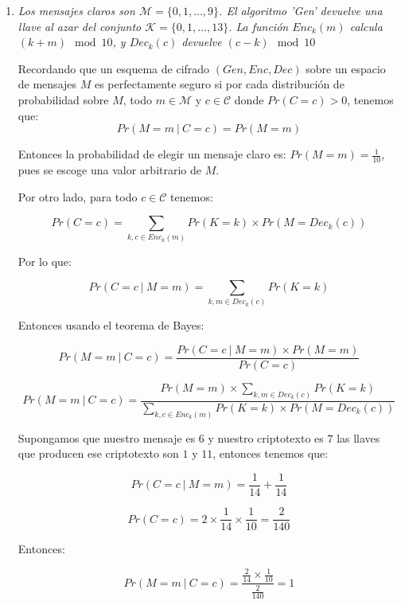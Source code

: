 \documentclass[11pt]{article}
\begin{document}
        \begin{enumerate}[label=\alph*)]
            \item \textit{Los mensajes claros son $ \mathcal{M} = \{0, 1, \dots, 9\} $. El algoritmo 'Gen' devuelve una llave al azar del conjunto $ \mathcal{K} = \{0, 1, \dots, 13\} $. La función $ Enc_{k}(m) $ calcula $ (k + m) \mod{10} $, y $ Dec_{k}(c) $ devuelve $ (c - k) \mod{10} $}
            
            Recordando que un esquema de cifrado $ (Gen, Enc, Dec) $ sobre un espacio de mensajes $ M $ es perfectamente seguro si por cada distribución de probabilidad sobre $ M $, todo $ m \in \mathcal{M} $ y $ c \in \mathcal{C} $ donde $ Pr(C = c) > 0 $, tenemos que:
            $$ Pr(M = m\ |\ C = c) = Pr(M = m) $$
            
            Entonces la probabilidad de elegir un mensaje claro es: $ Pr(M=m) = \frac{1}{10} $, pues se escoge una valor arbitrario de $ M $. 
            
            Por otro lado, para todo $ c \in \mathcal{C} $ tenemos:
            
            $$ \displaystyle Pr(C = c) = \sum_{k, c \in Enc_k(m)} Pr(K = k) \times Pr(M = Dec_{k}(c)) $$
            
            Por lo que:
            
            $$ Pr(C = c\ |\ M = m) = \sum_{k, m \in Dec_k(c)} Pr(K = k) $$
            
            Entonces usando el teorema de Bayes:
            
            $$ \displaystyle Pr(M = m\ |\ C = c) = \frac{Pr(C = c\ |\ M = m) \times Pr(M = m)}{Pr(C = c)} $$
            
            $$ \displaystyle Pr(M = m\ |\ C = c) = \frac{Pr(M = m) \times \sum_{k, m \in Dec_k(c)} Pr(K = k)}{\sum_{k, c \in Enc_k(m)} Pr(K = k) \times Pr(M = Dec_{k}(c))} $$
            
            Supongamos que nuestro mensaje es $ 6 $ y nuestro criptotexto es $ 7 $ las llaves que producen ese criptotexto son $ 1 $ y $ 11 $, entonces tenemos que:
            
            $$ Pr(C = c\ |\ M = m) = \frac{1}{14} + \frac{1}{14} $$
            
            $$ Pr(C = c) = 2 \times \frac{1}{14} \times \frac{1}{10} = \frac{2}{140} $$
            
            Entonces: 
            
            $$ \displaystyle Pr(M = m\ |\ C = c) = \frac{\frac{2}{14} \times \frac{1}{10}}{\frac{2}{140}} = 1 $$
            

\end{enumerate}
\end{document}
